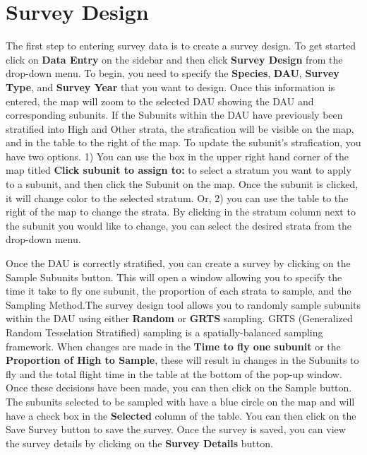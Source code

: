 \documentclass[
]{book}
\begin{document}
\hypertarget{dataentry-survde}{%
\section{Survey Design}\label{dataentry-survde}}

The first step to entering survey data is to create a survey design. To get started click on \textbf{Data Entry} on the sidebar and then click \textbf{Survey Design} from the drop-down menu. To begin, you need to specify the \textbf{Species}, \textbf{DAU}, \textbf{Survey Type}, and \textbf{Survey Year} that you want to design. Once this information is entered, the map will zoom to the selected DAU showing the DAU and corresponding subunits. If the Subunits within the DAU have previously been stratified into High and Other strata, the strafication will be visible on the map, and in the table to the right of the map. To update the subunit's strafication, you have two options. 1) You can use the box in the upper right hand corner of the map titled \textbf{Click subunit to assign to:} to select a stratum you want to apply to a subunit, and then click the Subunit on the map. Once the subunit is clicked, it will change color to the selected stratum. Or, 2) you can use the table to the right of the map to change the strata. By clicking in the stratum column next to the subunit you would like to change, you can select the desired strata from the drop-down menu.

Once the DAU is correctly stratified, you can create a survey by clicking on the {Sample Subunits} button. This will open a window allowing you to specify the time it take to fly one subunit, the proportion of each strata to sample, and the Sampling Method.The survey design tool allows you to randomly sample subunits within the DAU using either \textbf{Random} or \textbf{GRTS} sampling. GRTS (Generalized Random Tesselation Stratified) sampling is a spatially-balanced sampling framework. When changes are made in the \textbf{Time to fly one subunit} or the \textbf{Proportion of High to Sample}, these will result in changes in the Subunits to fly and the total flight time in the table at the bottom of the pop-up window. Once these decisions have been made, you can then click on the {Sample} button. The subunits selected to be sampled with have a blue circle on the map and will have a check box in the \textbf{Selected} column of the table. You can then click on the {Save Survey} button to save the survey. Once the survey is saved, you can view the survey details by clicking on the \textbf{Survey Details} button.
\end{document}
